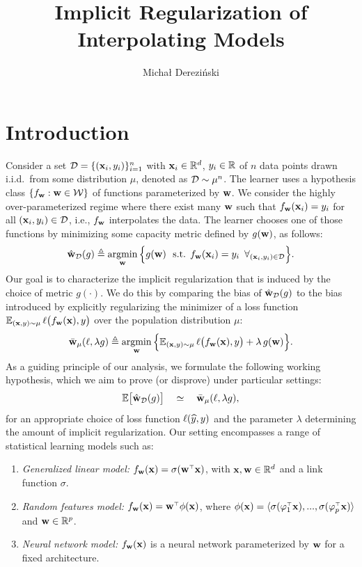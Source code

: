 \documentclass[11pt]{article}
\title{Implicit Regularization of Interpolating Models}
\author{%
    Micha{\l } Derezi\'{n}ski
 }
\date{}
\begin{document}
\maketitle


\section{Introduction}

Consider a set $\mathcal{D}=\{(\mathbf x_i,y_i)\}_{i=1}^n$ with $\mathbf x_i \in \mathbb R^d$, $y_i \in \mathbb R$ of $n$ data points drawn i.i.d.~from
some distribution $\mu$, denoted as $\mathcal{D}\sim\mu^n$. The learner uses a
hypothesis class $\{f_\mathbf w:\mathbf w\in \mathcal W\}$ of functions
parameterized by $\mathbf w$. We consider the highly over-parameterized
regime where there exist many $\mathbf w$ such that $f_\mathbf w(\mathbf x_i)=y_i$
for all $(\mathbf x_i,y_i)\in\mathcal{D}$, i.e., $f_\mathbf w$ interpolates the data. The
learner chooses one of those functions by minimizing 
some capacity metric defined by $g(\mathbf w)$, as follows:
\begin{align*}
  \hat {\mathbf w}_{\mathcal{D}}(g) \triangleq \operatorname*{\mathop{\mathrm{argmin}}}_{\mathbf w}\Big\{g(\mathbf w)\ \text{ s.t. }f_\mathbf w(\mathbf x_i)=y_i\ \,
  \forall_{(\mathbf x_i,y_i)\in\mathcal{D}}\Big\}.
\end{align*}
Our goal is to characterize the implicit regularization that is
induced by the choice of metric $g(\cdot)$. We do this by comparing the
bias of $\hat {\mathbf w}_{\mathcal{D}}(g)$ to the bias introduced by explicitly
regularizing the minimizer of a loss function
$\mathbb E_{(\mathbf x,y)\sim\mu}\,\ell\big(f_\mathbf w(\mathbf x),y\big)$ over the 
population distribution $\mu$:
\begin{align*}
\bar {\mathbf w}_\mu(\ell,\lambda g) \triangleq \operatorname*{\mathop{\mathrm{argmin}}}_{\mathbf w}\Big\{ 
\mathbb E_{(\mathbf x,y)\sim\mu}\,\ell\big(f_\mathbf w(\mathbf x),y\big) + \lambda
\,g(\mathbf w)\Big\}.
\end{align*}  
As a guiding 
principle of our analysis, we formulate the following working
hypothesis, which we aim to prove (or disprove) under particular settings: 
\begin{align}
  \mathbb E\big[\hat {\mathbf w}_{\mathcal{D}}(g)\big]\quad \simeq\quad \bar {\mathbf w}_\mu(\ell,\lambda g),\label{eq:hypothesis}
\end{align}
for an appropriate choice of loss function $\ell(\widehat{y},y)$ and the parameter $\lambda$
determining the amount of implicit regularization. Our setting
encompasses a range of statistical learning models such as:
\begin{enumerate}
\item \emph{Generalized linear model:} $f_\w(\x) =
  \sigma(\w^\top \x)$, with $\mathbf x,\mathbf w\in\mathbb R^d$ and a link function $\sigma$.
\item \emph{Random features model:} $f_\w(\x) =
  \w^\top \phi(\x)$, where $\phi(\x)=\langle\sigma(\varphi_1^\top
  \x),...,\sigma(\varphi_p^\top \x)\rangle$ and $\mathbf w\in\mathbb R^p$.
\item \emph{Neural network model:} $f_\mathbf w(\mathbf x)$ is a neural
  network parameterized by $\mathbf w$ for a fixed architecture.
\end{enumerate}
\end{document}
